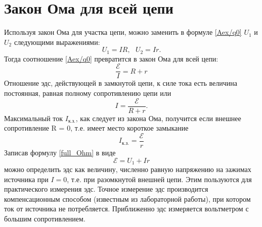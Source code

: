 \documentclass[a4paper,10pt]{book}
\begin{document}
\section{Закон Ома для всей цепи}
Используя закон Ома для участка цепи, можно заменить в формуле \ref{Aex/q0} $U_1$ и $U_2$ следующими выражениями:
\begin{equation}
 U_1 = IR,\text{ }U_2 = Ir.\nonumber
\end{equation}
Тогда соотношение \ref{Aex/q0} превратится в закон Ома для всей цепи: 
\begin{equation}\label{full_Ohm}
 \frac{\mathcal{E}}{I} = R + r
\end{equation}
Отношение эдс, действующей в замкнутой цепи, к силе тока есть величина постоянная, равная полному сопротивлению цепи или 
\begin{equation}\label{full_I}
 I = \frac{\mathcal{E}}{R + r}.
\end{equation}
Максимальный ток $I_\text{к.з.}$, как следует из закона Ома, получится если внешнее сопротивление R = 0, т.е. имеет место короткое замыкание
\begin{equation}\label{I_shcut}
 I_\text{к.з.} = \frac{\mathcal{E}}{r}
\end{equation}
Записав формулу \ref{full_Ohm} в виде
\begin{equation}
 \mathcal{E} = U_1 + Ir\nonumber
\end{equation}
можно определить эдс как величину, численно равную напряжению на зажимах источника при $I = 0$, т.е. при разомкнутой внешней цепи. Этим пользуются для практического измерения эдс. Точное измерение эдс производится компенсационным способом (известным из лабораторной работы), при котором ток от источника не потребляется. Приближенно эдс измеряется вольтметром с большим сопротивлением.
\end{document}
